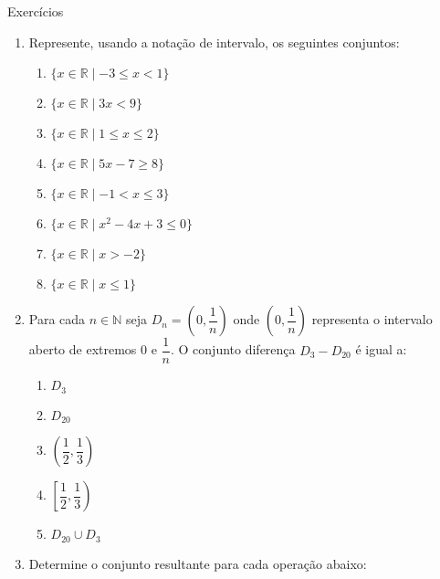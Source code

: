\documentclass[14pt, aspectratio=169]{beamer}
\newcommand{\R}{\mathbb{R}}
\newcommand{\N}{\mathbb{N}}
\begin{document}
\begin{frame}[allowframebreaks]{Exercícios}
\begin{enumerate}
    \vspace{5.0cm}

    \item Represente, usando a notação de intervalo, os seguintes conjuntos:

    \begin{multicols}{2}
        \begin{enumerate}[a]
            \item $\{ x \in \R \mid -3 \leq x < 1 \}$
            \item $\{ x \in \R \mid  3x < 9 \}$
            \item $\{ x \in \R \mid 1 \leq x \leq 2 \}$
            \item $\{ x \in \R \mid 5x - 7 \geq 8 \}$
            \item $\{ x \in \R \mid -1 < x \leq 3 \}$
            \item $\{ x \in \R \mid x^2 - 4x + 3 \leq 0 \}$
            \item $\{ x \in \R \mid x > -2 \}$
            \item $\{ x \in \R \mid x \leq 1 \}$
        \end{enumerate}
    \end{multicols}

    \vspace{5.0cm}

    \item Para cada $n \in \N$ seja $D_n = \left(0, \dfrac{1}{n} \right)$ onde $\left(0, \dfrac{1}{n} \right)$ representa o intervalo aberto de extremos 0 e $\dfrac{1}{n}$. O conjunto diferença $D_3 - D_{20}$ é igual a:

    \begin{multicols}{2}
        \begin{enumerate}[a]
            \item $D_3$
            \item $D_{20}$
            \item $\left(\dfrac{1}{2}, \dfrac{1}{3} \right)$
            \item $\left[\dfrac{1}{2}, \dfrac{1}{3} \right)$
            \item $D_{20} \cup D_3$
        \end{enumerate}
    \end{multicols}

    \vspace{5.0cm}

    \item Determine o conjunto resultante para cada operação abaixo:


\end{enumerate}
\end{frame}
\end{document}
